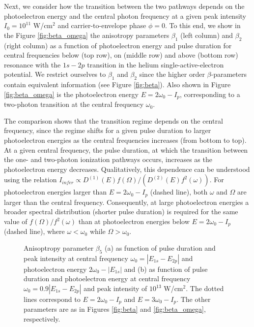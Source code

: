 Next, we consider how the transition between the two pathways depends on the photoelectron energy and the central photon frequency at a given peak intensity $I_0 = 10^{11}$ W/cm$^2$ and carrier-to-envelope phase $\phi = 0$. To this end, we show in the Figure \ref{fig:beta_omega} the 
anisotropy parameters $\beta_1$ (left column) and $\beta_2$ (right column) as a function of photoelectron energy and pulse duration for central frequencies below (top row), on (middle row) and above (bottom row) resonance with the $1s - 2p$ transition in the helium single-active-electron potential. We restrict ourselves to $\beta_1$ and $\beta_2$ since the higher order $\beta$-parameters contain equivalent information (see Figure \ref{fig:beta}). Also shown in Figure \ref{fig:beta_omega} is the photoelectron energy $E = 2\omega_0 - I_p$, corresponding to a two-photon transition at the central frequency $\omega_0$. 

The comparison shows that the transition regime depends on the central frequency, since the regime shifts for a given pulse duration to larger photoelectron energies as the central frequencies increases (from bottom to top). At a given central frequency, the pulse duration, at which the transition between the one- and two-photon ionization pathways occurs, increases as the photoelectron energy decreases. Qualitatively, this dependence can be understood using the relation $I_{infer} \propto D^{(1)}(E)f(\Omega)/(D^{(2)}(E)f^2(\omega))$. For photoelectron energies larger than $E = 2\omega_0 - I_p$ (dashed line), both $\omega$ and $\Omega$ are larger than the central frequency. Consequently, at large photoelectron energies a broader spectral distribution (shorter pulse duration) is required for the same value of $f(\Omega)/f^2(\omega)$ than at photoelectron energies below $E = 2\omega_0 - I_p$ (dashed line), where $\omega < \omega_0$ while $\Omega > \omega_0$. 

\begin{figure}[t]
\centering
\caption{
Anisoptropy parameter $\beta_5$ (a) as function of pulse duration and peak intensity at central frequency $\omega_0 = |E_{1s}-E_{2p}|$ and photoelectron energy $2\omega_0 - |E_{1s}|$ and (b) as function of pulse duration and photoelectron energy at central frequency $\omega_0 = 0.9|E_{1s}-E_{2p}|$ and peak intensity of $10^{13}$ W/cm$^2$. The dotted lines correspond to $E = 2\omega_0 - I_p$ and $E = 3\omega_0 - I_p$. The other parameters are as in Figures \ref{fig:beta} and \ref{fig:beta_omega}, respectively. 
} 
  \label{fig:beta-3w}
\end{figure}

